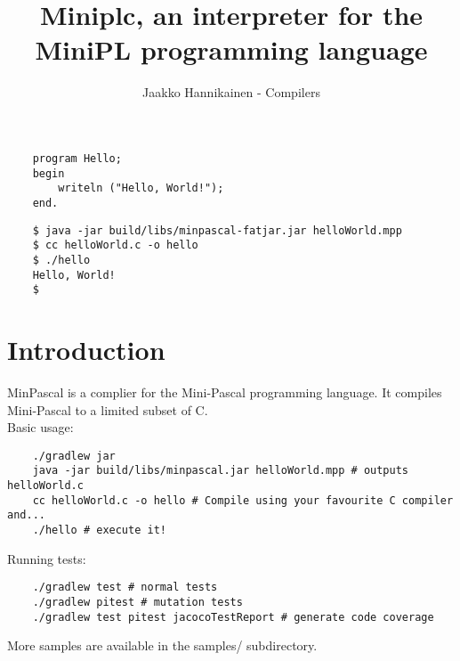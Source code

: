 \documentclass{article}
\author{Jaakko Hannikainen - Compilers}
\title{Miniplc, an interpreter for the MiniPL programming language}
\def\pascallexer{pascal.py:DelphiLexer -x}
\begin{document}
\maketitle

\noindent
\begin{minipage}{0.35\textwidth}
\begin{verbatim}
    program Hello;
    begin
        writeln ("Hello, World!");
    end.
\end{verbatim}
\end{minipage}
\begin{minipage}{0.54\textwidth}
\begin{verbatim}
    $ java -jar build/libs/minpascal-fatjar.jar helloWorld.mpp
    $ cc helloWorld.c -o hello
    $ ./hello
    Hello, World!
    $
\end{verbatim}
\end{minipage}

\section{Introduction}
MinPascal is a complier for the Mini-Pascal programming language. It
compiles Mini-Pascal to a limited subset of C. \\[1.5em]

\noindent
Basic usage:
\begin{verbatim}
    ./gradlew jar
    java -jar build/libs/minpascal.jar helloWorld.mpp # outputs helloWorld.c
    cc helloWorld.c -o hello # Compile using your favourite C compiler and...
    ./hello # execute it!
\end{verbatim}

\noindent
Running tests:
\begin{verbatim}
    ./gradlew test # normal tests
    ./gradlew pitest # mutation tests
    ./gradlew test pitest jacocoTestReport # generate code coverage
\end{verbatim}

\noindent
More samples are available in the samples/ subdirectory.

\newpage
\end{document}
